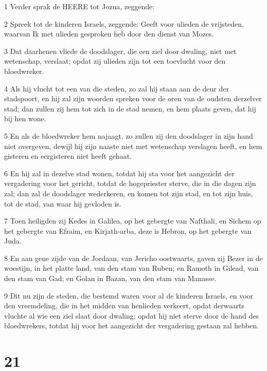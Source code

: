 \par 1 Verder sprak de HEERE tot Jozua, zeggende:
\par 2 Spreek tot de kinderen Israels, zeggende: Geeft voor ulieden de vrijsteden, waarvan Ik met ulieden gesproken heb door den dienst van Mozes.
\par 3 Dat daarhenen vliede de doodslager, die een ziel door dwaling, niet met wetenschap, verslaat; opdat zij ulieden zijn tot een toevlucht voor den bloedwreker.
\par 4 Als hij vlucht tot een van die steden, zo zal hij staan aan de deur der stadspoort, en hij zal zijn woorden spreken voor de oren van de oudsten derzelver stad; dan zullen zij hem tot zich in de stad nemen, en hem plaats geven, dat hij bij hen wone.
\par 5 En als de bloedwreker hem najaagt, zo zullen zij den doodslager in zijn hand niet overgeven, dewijl hij zijn naaste niet met wetenschap verslagen heeft, en hem gisteren en eergisteren niet heeft gehaat.
\par 6 En hij zal in dezelve stad wonen, totdat hij sta voor het aangezicht der vergadering voor het gericht, totdat de hogepriester sterve, die in die dagen zijn zal; dan zal de doodslager wederkeren, en komen tot zijn stad, en tot zijn huis, tot de stad, van waar hij gevloden is.
\par 7 Toen heiligden zij Kedes in Galilea, op het gebergte van Nafthali, en Sichem op het gebergte van Efraim, en Kirjath-arba, deze is Hebron, op het gebergte van Juda.
\par 8 En aan gene zijde van de Jordaan, van Jericho oostwaarts, gaven zij Bezer in de woestijn, in het platte land, van den stam van Ruben; en Ramoth in Gilead, van den stam van Gad; en Golan in Bazan, van den stam van Manasse.
\par 9 Dit nu zijn de steden, die bestemd waren voor al de kinderen Israels, en voor den vreemdeling, die in het midden van henlieden verkeert, opdat derwaarts vluchte al wie een ziel slaat door dwaling; opdat hij niet sterve door de hand des bloedwrekers, totdat hij voor het aangezicht der vergadering gestaan zal hebben.

\chapter{21}

